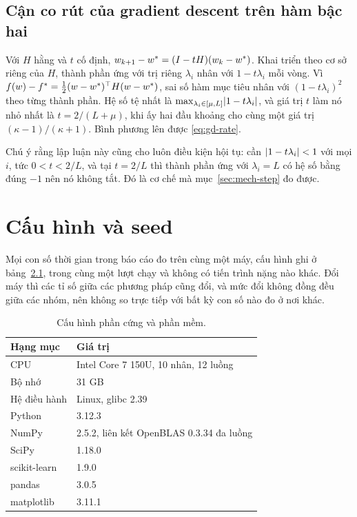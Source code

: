 \section{Cận co rút của gradient descent trên hàm bậc hai}

Với $H$ hằng và $t$ cố định, $w_{k+1} - w^{*} = (I - tH)(w_k - w^{*})$. Khai
triển theo cơ sở riêng của $H$, thành phần ứng với trị riêng $\lambda_i$ nhân với
$1 - t\lambda_i$ mỗi vòng. Vì $f(w) - f^{*} = \tfrac{1}{2}(w-w^{*})^{\top} H (w-w^{*})$,
sai số hàm mục tiêu nhân với $(1 - t\lambda_i)^{2}$ theo từng thành phần. Hệ số
tệ nhất là $\max_{\lambda_i \in [\mu, L]} \lvert1 - t\lambda_i\rvert$, và giá trị $t$
làm nó nhỏ nhất là $t = 2/(L+\mu)$, khi ấy hai đầu khoảng cho cùng một giá trị
$(\kappa-1)/(\kappa+1)$. Bình phương lên được \eqref{eq:gd-rate}.

Chú ý rằng lập luận này cũng cho luôn điều kiện hội tụ: cần
$\lvert1 - t\lambda_i\rvert < 1$ với mọi $i$, tức $0 < t < 2/L$, và tại $t = 2/L$ thì
thành phần ứng với $\lambda_i = L$ có hệ số bằng đúng $-1$ nên nó không tắt. Đó
là cơ chế mà mục~\ref{sec:mech-step} đo được.

\chapter{Cấu hình và seed}
\label{app:config}

Mọi con số thời gian trong báo cáo đo trên cùng một máy, cấu hình ghi ở
bảng~\ref{tab:config}, trong cùng một lượt chạy và không có tiến trình nặng nào
khác. Đổi máy thì các tỉ số giữa các phương
pháp cũng đổi, và mức đổi không đồng đều giữa các nhóm, nên không so trực tiếp
với bất kỳ con số nào đo ở nơi khác.

\begin{table}[tp]
  \centering
  \caption{Cấu hình phần cứng và phần mềm.}
  \label{tab:config}
  \begin{tabular}{ll}
    \toprule
    Hạng mục & Giá trị \\
    \midrule
    CPU        & Intel Core 7 150U, 10 nhân, 12 luồng \\
    Bộ nhớ     & 31 GB \\
    Hệ điều hành & Linux, glibc 2.39 \\
    Python     & 3.12.3 \\
    NumPy      & 2.5.2, liên kết OpenBLAS 0.3.34 đa luồng \\
    SciPy      & 1.18.0 \\
    scikit-learn & 1.9.0 \\
    pandas     & 3.0.5 \\
    matplotlib & 3.11.1 \\
    \bottomrule
  \end{tabular}
\end{table}


